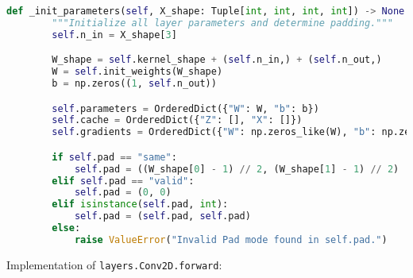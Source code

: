 \begin{lstlisting}[language=Python]
    def _init_parameters(self, X_shape: Tuple[int, int, int, int]) -> None:
        """Initialize all layer parameters and determine padding."""
        self.n_in = X_shape[3]

        W_shape = self.kernel_shape + (self.n_in,) + (self.n_out,)
        W = self.init_weights(W_shape)
        b = np.zeros((1, self.n_out))

        self.parameters = OrderedDict({"W": W, "b": b})
        self.cache = OrderedDict({"Z": [], "X": []})
        self.gradients = OrderedDict({"W": np.zeros_like(W), "b": np.zeros_like(b)})

        if self.pad == "same":
            self.pad = ((W_shape[0] - 1) // 2, (W_shape[1] - 1) // 2)
        elif self.pad == "valid":
            self.pad = (0, 0)
        elif isinstance(self.pad, int):
            self.pad = (self.pad, self.pad)
        else:
            raise ValueError("Invalid Pad mode found in self.pad.")

\end{lstlisting}

Implementation of \texttt{layers.Conv2D.forward}:

